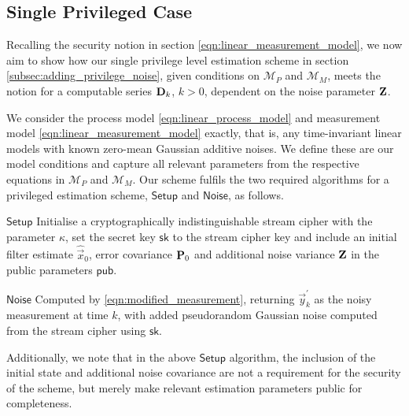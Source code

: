 \documentclass[letterpaper, 10 pt, conference]{IEEEtran}
\theoremstyle{definition}
\begin{document}
\subsection{Single Privileged Case}
Recalling the security notion in section \eqref{eqn:linear_measurement_model}, we now aim to show how our single privilege level estimation scheme in section \ref{subsec:adding_privilege_noise}, given conditions on $\mathcal{M}_P$ and $\mathcal{M}_M$, meets the notion for a computable series ${{\mathbf{D}}}_k$, $k>0$, dependent on the noise parameter ${{\mathbf{Z}}}$.

We consider the process model \eqref{eqn:linear_process_model} and measurement model \eqref{eqn:linear_measurement_model} exactly, that is, any time-invariant linear models with known zero-mean Gaussian additive noises. We define these are our model conditions and capture all relevant parameters from the respective equations in $\mathcal{M}_P$ and $\mathcal{M}_M$. Our scheme fulfils the two required algorithms for a privileged estimation scheme, $\mathsf{Setup}$ and $\mathsf{Noise}$, as follows.
\begin{LaTeXdescription}
   \item[$\mathsf{Setup}$] Initialise a cryptographically indistinguishable stream cipher with the parameter $\kappa$, set the secret key $\mathsf{sk}$ to the stream cipher key and include an initial filter estimate $\hat{\vec{x}}_0$, error covariance ${{\mathbf{P}}}_0$ and additional noise variance ${{\mathbf{Z}}}$ in the public parameters $\mathsf{pub}$.
   \item[$\mathsf{Noise}$] Computed by \eqref{eqn:modified_measurement}, returning $\vec{y}^\prime_k$ as the noisy measurement at time $k$, with added pseudorandom Gaussian noise computed from the stream cipher using $\mathsf{sk}$.
\end{LaTeXdescription}
Additionally, we note that in the above $\mathsf{Setup}$ algorithm, the inclusion of the initial state and additional noise covariance are not a requirement for the security of the scheme, but merely make relevant estimation parameters public for completeness.
\end{document}
